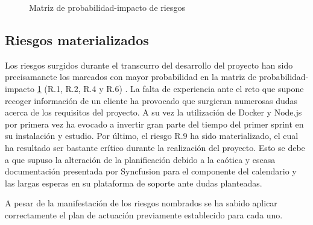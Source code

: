\begin{figure}[H]
    \caption{Matriz de probabilidad-impacto de riesgos}
    \label{fig:analisis-riesgos}
\end{figure}

\subsection{Riesgos materializados} \label{riesgos-materializados}
Los riesgos surgidos durante el transcurro del desarrollo del proyecto han sido precisamanete los marcados con mayor probabilidad en la matriz de probabilidad-impacto \ref{fig:analisis-riesgos} (R.1, R.2, R.4 y R.6) . La falta de experiencia ante el reto que supone recoger información de un cliente ha provocado que surgieran numerosas dudas acerca de los requisitos del proyecto. A su vez la utilización de Docker y Node.js por primera vez ha evocado a invertir gran parte del tiempo del primer sprint en su instalación y estudio. Por último, el riesgo R.9 ha sido materializado, el cual ha resultado ser bastante crítico durante la realización del proyecto. Esto se debe a que supuso la alteración de la planificación debido a la caótica y escasa documentación presentada por Syncfusion para el componente del calendario y las largas esperas en su plataforma de soporte ante dudas planteadas. \bigskip

A pesar de la manifestación de los riesgos nombrados se ha sabido aplicar correctamente el plan de actuación previamente establecido para cada uno.